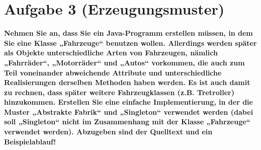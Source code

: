 \section{Aufgabe 3 (Erzeugungsmuster)}

\textbf{Nehmen Sie an, dass Sie ein Java-Programm erstellen müssen, in dem Sie eine Klasse
„Fahrzeuge“ benutzen wollen. Allerdings werden später als Objekte unterschiedliche Arten
von Fahrzeugen, nämlich „Fahrräder“, „Motorräder“ und „Autos“ vorkommen, die auch zum
Teil voneinander abweichende Attribute und unterschiedliche Realisierungen derselben
Methoden haben werden. Es ist auch damit zu rechnen, dass später weitere
Fahrzeugklassen (z.B. Tretroller) hinzukommen. Erstellen Sie eine einfache
Implementierung, in der die Muster „Abstrakte Fabrik“ und „Singleton“ verwendet werden
(dabei soll „Singleton“ nicht im Zusammenhang mit der Klasse „Fahrzeuge“ verwendet
werden).
Abzugeben sind der Quelltext und ein Beispielablauf!}

\clearpage
